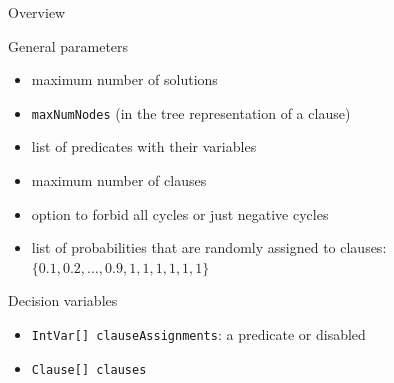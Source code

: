 \documentclass{beamer}
\begin{document}

\begin{frame}{Overview}
  \begin{block}{General parameters}
    \begin{itemize}
    \item maximum number of solutions
    \item \texttt{maxNumNodes} (in the tree representation of a clause)
    \item list of predicates with their variables
    \item maximum number of clauses
    \item option to forbid all cycles or just negative cycles
    \item list of probabilities that are randomly assigned to clauses: $\{ 0.1,
      0.2, \dots, 0.9, 1, 1, 1, 1, 1, 1 \}$
    \end{itemize}
  \end{block}
  \begin{block}{Decision variables}
    \begin{itemize}
    \item \texttt{IntVar[] clauseAssignments}: a predicate or disabled
    \item \texttt{Clause[] clauses}
    \end{itemize}
  \end{block}
\end{frame}
\end{document}
